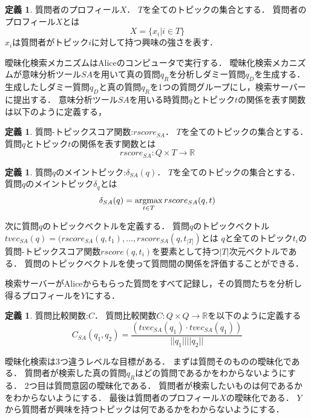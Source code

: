 \documentclass[master]{suribt}
\theoremstyle{definition}
\newtheorem{defi}[thm]{定義}
\newcommand{\argmax}{\mathop{\rm argmax}\limits}
\begin{document}
 \begin{defi}{質問者のプロフィール$X$．}
  $T$を全てのトピックの集合とする．
  質問者のプロフィール$X$とは
  \begin{equation}
   X = \{x_i| i \in T\}
  \end{equation}
  $x_i$は質問者がトピック$i$に対して持つ興味の強さを表す．
 \end{defi}
 曖昧化検索メカニズムはAliceのコンピュータで実行する．
 曖昧化検索メカニズムが意味分析ツール$SA$を用いて真の質問$q_R$を分析しダミー質問$q_D$を生成する．
 生成したしダミー質問$q_D$と真の質問$q_R$を1つの質問グループにし，検索サーバーに提出する．
 意味分析ツール$SA$を用いる時質問$q$とトピック$t$の関係を表す関数は以下のように定義する，
 
 \begin{defi}{質問-トピックスコア関数:$rscore_{SA}$．}
  $T$を全てのトピックの集合とする．
  質問$q$とトピック$t$の関係を表す関数とは
  \begin{equation}
   rscore_{SA}:Q \times T \to \mathbb{R}
  \end{equation}
 \end{defi}

 \begin{defi}{質問$q$のメイントピック:$\delta_{SA}(q)$．}
  $T$を全てのトピックの集合とする．
  質問$q$のメイントピック$\delta_q$とは
  \begin{equation}
   \delta_{SA}(q) = \argmax_{t \in T} rscore_{SA}(q,t)
  \end{equation}
 \end{defi}

 次に質問$q$のトピックベクトルを定義する．
 質問$q$のトピックベクトル$tvec_{SA}(q) = (rscore_{SA}(q,t_1 ), \dots , rscore_{SA}(q,t_{|T|})$とは
 $q$と全てのトピック$t_i$の質問-トピックスコア関数$rscore(q, t_i)$を要素として持つ$|T|$次元ベクトルである．
 質問のトピックベクトルを使って質問間の関係を評価することができる．

 検索サーバーがAliceからもらった質問をすべて記録し，その質問たちを分析し得るプロフィールを$Y$にする．

 \begin{defi}{質問比較関数:$C$．}
  質問比較関数$C:Q \times Q \rightarrow \mathbb{R}$を以下のように定義する
  \begin{equation}
  C_{SA}(q_1,q_2) = \frac{(tvec_{SA}(q_1) \cdot tvec_{SA}(q_1))}{||q_1|| ||q_2||}
  \end{equation}
 \end{defi}
 
 
 曖昧化検索は3つ違うレベルな目標がある．
 まずは質問そのものの曖昧化である．
 質問者が検索した真の質問$q_R$はどの質問であるかをわからないようにする．
 2つ目は質問意図の曖昧化である．
 質問者が検索したいものは何であるかをわからないようにする．
 最後は質問者のプロフィール$X$の曖昧化である．
 $Y$から質問者が興味を持つトピックは何であるかをわからないようにする．
 
\end{document}
